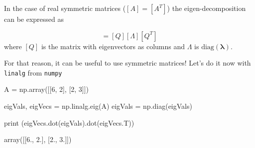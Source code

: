In the case of real symmetric matrices ($[A]=[A^T]$) the eigen-decomposition can be expressed as

\begin{equation}
[A]=[Q][\Lambda][Q^T]
\end{equation} 
where $[Q]$ is the matrix with eigenvectors as columns and $\Lambda$ is $\textrm{diag}(\boldsymbol{\lambda})$.

For that reason, it can be useful to use symmetric matrices! Let's do it now with \texttt{linalg} from \texttt{numpy}

\begin{ipython}
A = np.array([[6, 2], [2, 3]])

eigVals, eigVecs = np.linalg.eig(A)
eigVals = np.diag(eigVals)

print (eigVecs.dot(eigVals).dot(eigVecs.T))
\end{ipython}
\begin{ioutput}
array([[6., 2.],
       [2., 3.]])
\end{ioutput}

